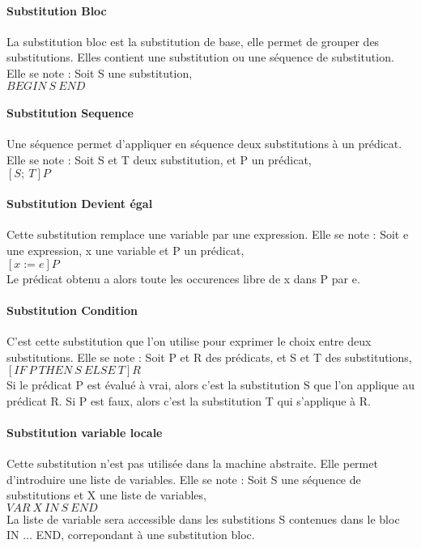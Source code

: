 \paragraph{Substitution Bloc}
La substitution bloc est la substitution de base, elle permet de grouper des
substitutions. Elles contient une substitution ou une séquence de substitution.
Elle se note : Soit S une substitution, \\
$BEGIN~ S~ END$ 

\paragraph{Substitution Sequence}
Une séquence permet d'appliquer en séquence deux substitutions à un
prédicat. Elle se note : Soit S et T deux substitution, et P un prédicat, \\
$[S;~ T]P$

\paragraph{Substitution Devient égal}
Cette substitution remplace une variable par une expression. Elle se note : Soit
e une expression, x une variable et P un prédicat, \\
$[x:=e]P$  \\
Le prédicat obtenu a alors toute les occurences libre de x dans P par e.

\paragraph{Substitution Condition}
C'est cette substitution que l'on utilise pour exprimer le choix entre deux
substitutions. Elle se note : Soit P et R des prédicats, et S et T des substitutions,\\
$[IF~ P~ THEN~ S~ ELSE~ T]R$ \\
Si le prédicat P est évalué à vrai, alors c'est la substitution S que l'on
applique au prédicat R. Si P est faux, alors c'est la substitution T qui
s'applique à R.

\paragraph{Substitution variable locale}
Cette substitution n'est pas utilisée dans la machine abstraite. Elle permet
d'introduire une liste de variables.
Elle se note : Soit S une séquence de substitutions et X une liste de variables,\\
$VAR~ X~ IN~ S~ END$\\
La liste de variable sera accessible dans les substitions S contenues dans le
bloc IN ... END, correpondant à une substitution bloc.

